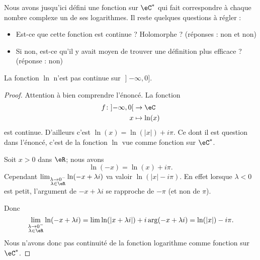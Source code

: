 Nous avons jusqu'ici défini une fonction sur \( \eC^*\) qui fait correspondre à chaque nombre complexe un de ses logarithmes. Il reste quelques questions à régler :
\begin{itemize}
	\item Est-ce que cette fonction est continue ? Holomorphe ? (réponses : non et non)
	\item Si non, est-ce qu'il y avait moyen de trouver une définition plus efficace ? (réponse : non)
\end{itemize}

\begin{lemma}       \label{LEMooMUOIooCnoWwq}
	La fonction \( \ln\) n'est pas continue sur \( \mathopen] -\infty , 0 \mathclose]\).
\end{lemma}

\begin{proof}
	Attention à bien comprendre l'énoncé. La fonction
	\begin{equation}
		\begin{aligned}
			f\colon \mathopen] -\infty , 0 \mathclose[ & \to \eC        \\
			x                                          & \mapsto \ln(x)
		\end{aligned}
	\end{equation}
	est continue. D'ailleurs c'est \( \ln(x)=\ln(| x |)+i\pi\). Ce dont il est question dans l'énoncé, c'est de la fonction \( \ln\) vue comme fonction sur \( \eC^*\).

	Soit \( x>0\) dans \( \eR\); nous avons
	\begin{equation}
		\ln(-x)=\ln(x)+i\pi.
	\end{equation}
	Cependant \( \lim_{\substack{\lambda\to 0^-\\\lambda\in \eR}}\ln(-x+\lambda i) \) va valoir \( \ln(| x |-i\pi)\). En effet lorsque \( \lambda<0\) est petit, l'argument de \( -x+\lambda i\) se rapproche de \( -\pi\) (et non de \( \pi\)).

	\begin{center}
		
	\end{center}

	Donc
	\begin{equation}
		\lim_{\substack{\lambda\to 0^-\\\lambda\in \eR}}\ln(-x+\lambda i)=\lim \ln(| x+\lambda i |)+i\arg(-x+\lambda i)=\ln(| x |)-i\pi.
	\end{equation}
	Nous n'avons donc pas continuité de la fonction logarithme comme fonction sur \( \eC^*\).
\end{proof}

